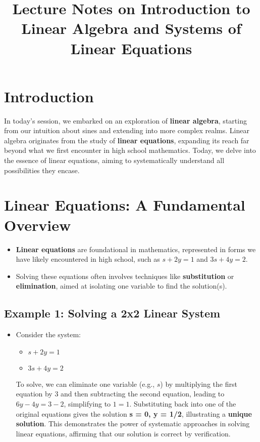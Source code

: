 \documentclass{article}
\title{Lecture Notes on Introduction to Linear Algebra and Systems of Linear Equations}
\author{}
\date{}
\begin{document}
\maketitle

\tableofcontents

\newpage

\section{Introduction}

In today’s session, we embarked on an exploration of \textbf{linear algebra}, starting from our intuition about sines and extending into more complex realms. Linear algebra originates from the study of \textbf{linear equations}, expanding its reach far beyond what we first encounter in high school mathematics. Today, we delve into the essence of linear equations, aiming to systematically understand all possibilities they encase.

\section{Linear Equations: A Fundamental Overview}

\begin{itemize}
    \item \textbf{Linear equations} are foundational in mathematics, represented in forms we have likely encountered in high school, such as \(s + 2y = 1\) and \(3s + 4y = 2\).
    \item Solving these equations often involves techniques like \textbf{substitution} or \textbf{elimination}, aimed at isolating one variable to find the solution(s).
\end{itemize}

\subsection{Example 1: Solving a 2x2 Linear System}

\begin{itemize}
    \item Consider the system: 
    \begin{itemize}
        \item \(s + 2y = 1\)
        \item \(3s + 4y = 2\)
    \end{itemize}
    To solve, we can eliminate one variable (e.g., \(s\)) by multiplying the first equation by 3 and then subtracting the second equation, leading to \(6y - 4y = 3 - 2\), simplifying to \(1 = 1\). Substituting back into one of the original equations gives the solution \textbf{s = 0, y = 1/2}, illustrating a \textbf{unique solution}. This demonstrates the power of systematic approaches in solving linear equations, affirming that our solution is correct by verification.
\end{itemize}
\end{document}
